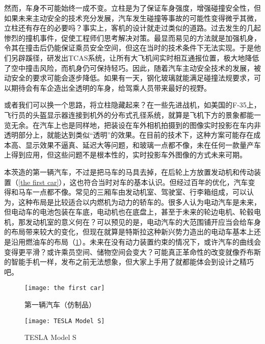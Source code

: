 \documentclass[UTF8]{ctexart}
\numberwithin{figure}{section}
\numberwithin{table}{section}
\begin{document}
然而，车身不可能始终一成不变。立柱是为了保证车身强度，增强碰撞安全性，但如果未来主动安全的技术充分发展，汽车发生碰撞等事故的可能性变得微乎其微，立柱还有存在的必要吗？事实上，客机的设计就走过类似的道路。过去发生的几起惨烈的撞机事件，促使工程师们思考解决对策。最显而易见的方法就是加强机身，令其在撞击后仍能保证乘员安全空间，但这在当时的技术条件下无法实现。于是他们另辟蹊径，研发出TCAS系统，让所有大飞机间实时相互通报位置，极大地降低了空中撞击风险，而机身仍可保持轻巧。因此，随着汽车主动安全技术的发展，被动安全的要求可能会逐步降低。如果有一天，钢化玻璃就能满足碰撞法规要求，可以期待会有车企造出全透明的车身，给驾乘人员带来最好的视野。

或者我们可以换一个思路，将立柱隐藏起来？在一些先进战机，如美国的F-35上，飞行员的头盔显示器连接到机外的分布式孔径系统，就算是飞机下方的景象都能一览无余。在汽车上也是同样地，把装设在车外相机拍摄到的图像实时投影在车内非透明部分上，就能达到类似“透明”的效果。在目前的技术下，这种方案可能存在成本高、显示效果不逼真、延迟大等问题，和玻璃一点都不像，未在任何一款量产车上得到应用，但这些问题不是根本性的，实时投影车外图像的方式未来可期。

本茨造的第一辆汽车，不过是把马车的马具去掉，在后轮上方放置发动机和传动装置（\cref{the first car}），这也符合当时对车的基本认识。但经过百年的优化，汽车变得和马车一点都不像。常见的三厢车由发动机室、驾驶室、行李箱组成，可以认为，这种布局是比较适合以内燃机为动力的轿车的。很多人认为电动汽车是未来，但电动车的电池包装在车底，电动机也在底盘上，甚至于未来的轮边电机、轮毂电机，那发动机室的意义何在？可以预见的是，电动汽车的大范围铺开应当会给车身的布局带来较大的变化，但现在就算是特斯拉这种新兴势力造出的电动车基本上还是沿用燃油车的布局（\cref{TESLA Model S}）。未来在没有动力装置约束的情况下，或许汽车的曲线会变得更平滑？或许乘员空间、储物空间会变大？可能真正革命性的改变就像乔布斯的智能手机一样，发布之前无法想象，但大家上手用了就都能体会到设计之精巧吧。

\begin{figure}[htbp]
	\begin{minipage}[b]{0.4\textwidth}
		\centering
		\texttt{[image: the first car]}
		\caption{第一辆汽车（仿制品）}
		\label{the first car}
	\end{minipage}
	\begin{minipage}[b]{0.55\textwidth}
		\centering
		\texttt{[image: TESLA Model S]}
		\caption{TESLA Model S}
		\label{TESLA Model S}
	\end{minipage}
\end{figure}

\clearpage
\end{document}
